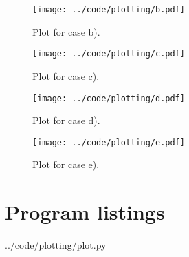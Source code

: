 \begin{figure}[H]
  \centering
  \texttt{[image: ../code/plotting/b.pdf]}
  \caption{Plot for case b).}
  \label{fig:caseb}
\end{figure}

\begin{figure}[H]
  \centering
  \texttt{[image: ../code/plotting/c.pdf]}
  \caption{Plot for case c).}
  \label{fig:casec}
\end{figure}

\begin{figure}[H]
  \centering
  \texttt{[image: ../code/plotting/d.pdf]}
  \caption{Plot for case d).}
  \label{fig:cased}
\end{figure}

\begin{figure}[H]
  \centering
  \texttt{[image: ../code/plotting/e.pdf]}
  \caption{Plot for case e).}
  \label{fig:casee}
\end{figure}



\clearpage
\section{Program listings} %
\label{sec:program_listings}


  {../code/plotting/plot.py}


